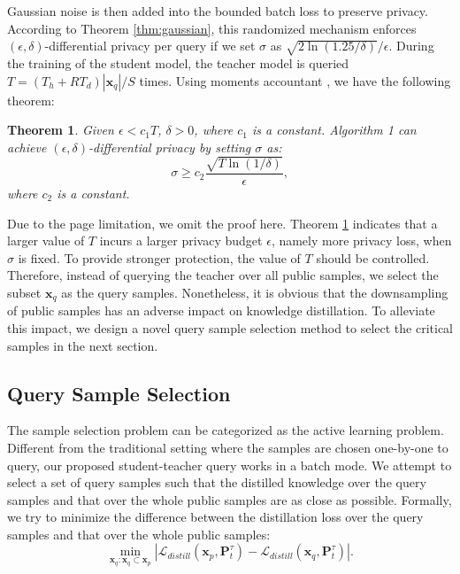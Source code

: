 \documentclass[letterpaper]{article} %
\newtheorem{thm}{Theorem}
\begin{document}
Gaussian noise is then added into the bounded batch loss to preserve privacy. According to Theorem \ref{thm:gaussian}, this randomized mechanism enforces $(\epsilon,\delta)$-differential privacy per query if we set $\sigma$ as $\sqrt { 2\ln(1.25/\delta ) } /\epsilon $. During the training of the student model, the teacher model is queried $T=(T_h+RT_d)|\textbf{x}_q|/S$ times. Using moments accountant \cite{abadi2016deep}, we have the following theorem:

\begin{thm}\label{thm:moments}
Given $\epsilon<c_1T$, $\delta>0$, where $c_1$ is a constant. Algorithm 1 can achieve $(\epsilon,\delta)$-differential privacy by setting $\sigma$ as:
\begin{equation}
    \sigma\geq c_2\frac{\sqrt{T\ln(1/\delta)}}{\epsilon},
\end{equation}
where $c_2$ is a constant.
\end{thm}

Due to the page limitation, we omit the proof here. Theorem \ref{thm:moments} indicates that a larger value of $T$ incurs a larger privacy budget $\epsilon$, namely more privacy loss, when $\sigma$ is fixed. To provide stronger protection, the value of $T$ should be controlled. Therefore, instead of querying the teacher over all public samples, we select the subset $\textbf{x}_q$ as the query samples. Nonetheless, it is obvious that the downsampling of public samples has an adverse impact on knowledge distillation. To alleviate this impact, we design a novel query sample selection method to select the critical samples in the next section.

\subsection{Query Sample Selection}
The sample selection problem can be categorized as the active learning problem. Different from the traditional setting where the samples are chosen one-by-one to query, our proposed student-teacher query works in a batch mode. We attempt to select a set of query samples such that the distilled knowledge over the query samples and that over the whole public samples are as close as possible. Formally, we try to minimize the difference between the distillation loss over the query samples and that over the whole public samples:
\begin{equation}\label{eq:objection}
\mathop {\min }\limits_{{\textbf{x}_q}:{\textbf{x}_q} \subset {\textbf{x}_p}} \left| {{\mathcal{L}_{distill}}({\textbf{x}_p},\textbf{P}_t^\tau ) - {\mathcal{L}_{distill}}({\textbf{x}_q},\textbf{P}_t^\tau )} \right|.
\end{equation}
\end{document}
